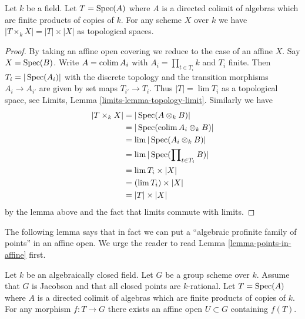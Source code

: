 \begin{lemma}
\label{lemma-profinite-product-over-field}
Let $k$ be a field. Let $T = \mathop{\mathrm{Spec}}(A)$ where $A$ is a directed colimit of
algebras which are finite products of copies of $k$. For any scheme $X$
over $k$ we have $|T \times_k X| = |T| \times |X|$ as topological spaces.
\end{lemma}

\begin{proof}
By taking an affine open covering we reduce to the case of an affine $X$.
Say $X = \mathop{\mathrm{Spec}}(B)$.
Write $A = \mathop{\mathrm{colim}}\nolimits A_i$ with $A_i = \prod_{t \in T_i} k$ and $T_i$ finite.
Then $T_i = |\mathop{\mathrm{Spec}}(A_i)|$ with the discrete topology and the transition
morphisms $A_i \to A_{i'}$ are given by set maps $T_{i'} \to T_i$. Thus
$|T| = \lim T_i$ as a topological space, see
Limits, Lemma \ref{limits-lemma-topology-limit}. Similarly we have
\begin{align*}
|T \times_k X| & =
|\mathop{\mathrm{Spec}}(A \otimes_k B)| \\
& =
|\mathop{\mathrm{Spec}}(\mathop{\mathrm{colim}}\nolimits A_i \otimes_k B)| \\
& =
\mathop{\mathrm{lim}}\nolimits |\mathop{\mathrm{Spec}}(A_i \otimes_k B)| \\
& =
\mathop{\mathrm{lim}}\nolimits |\mathop{\mathrm{Spec}}(\prod\nolimits_{t \in T_i} B)| \\
& =
\mathop{\mathrm{lim}}\nolimits T_i \times |X| \\
& =
(\mathop{\mathrm{lim}}\nolimits T_i) \times |X| \\
& =
|T| \times |X|
\end{align*}
by the lemma above and the fact that limits commute with limits.
\end{proof}

\noindent
The following lemma says that in fact we can put a
``algebraic profinite family of points'' in an affine open.
We urge the reader to read Lemma \ref{lemma-points-in-affine} first.

\begin{lemma}
\label{lemma-compact-set-in-affine}
Let $k$ be an algebraically closed field. Let $G$ be a group scheme over $k$.
Assume that $G$ is Jacobson and that all closed points are $k$-rational.
Let $T = \mathop{\mathrm{Spec}}(A)$ where $A$ is a directed colimit of algebras which
are finite products of copies of $k$. For any morphism $f : T \to G$
there exists an affine open $U \subset G$ containing $f(T)$.
\end{lemma}

